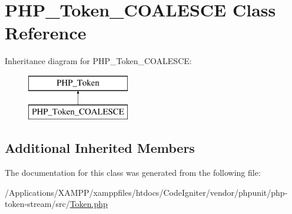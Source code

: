 \hypertarget{class_p_h_p___token___c_o_a_l_e_s_c_e}{}\section{P\+H\+P\+\_\+\+Token\+\_\+\+C\+O\+A\+L\+E\+S\+CE Class Reference}
\label{class_p_h_p___token___c_o_a_l_e_s_c_e}
Inheritance diagram for P\+H\+P\+\_\+\+Token\+\_\+\+C\+O\+A\+L\+E\+S\+CE\+:\begin{figure}[H]
\begin{center}
\leavevmode
\includegraphics[height=2.000000cm]{class_p_h_p___token___c_o_a_l_e_s_c_e}
\end{center}
\end{figure}
\subsection*{Additional Inherited Members}


The documentation for this class was generated from the following file\+:\begin{DoxyCompactItemize}
\item 
/\+Applications/\+X\+A\+M\+P\+P/xamppfiles/htdocs/\+Code\+Igniter/vendor/phpunit/php-\/token-\/stream/src/\mbox{\hyperlink{_token_8php}{Token.\+php}}\end{DoxyCompactItemize}
